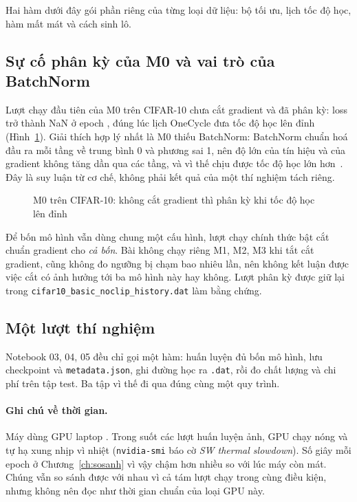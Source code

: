 Hai hàm dưới đây gói phần riêng của từng loại dữ liệu: bộ tối ưu, lịch tốc độ học, hàm mất mát và cách sinh lô.


\subsection{Sự cố phân kỳ của M0 và vai trò của BatchNorm}

Lượt chạy đầu tiên của M0 trên CIFAR-10 chưa cắt gradient và đã phân kỳ: loss trở thành NaN ở epoch
, đúng lúc lịch OneCycle đưa tốc độ học lên đỉnh
 (Hình~\ref{fig:clip}). Giải thích hợp lý nhất là M0 thiếu BatchNorm: BatchNorm chuẩn hoá đầu ra
mỗi tầng về trung bình 0 và phương sai 1, nên độ lớn của tín hiệu và của gradient không tăng dần qua các tầng, và vì thế
chịu được tốc độ học lớn hơn~\cite{ioffe2015}. Đây là suy luận từ cơ chế, không phải kết quả của một thí nghiệm tách riêng.

\begin{figure}[H]
  \centering
  \caption{M0 trên CIFAR-10: không cắt gradient thì phân kỳ khi tốc độ học lên đỉnh}
  \label{fig:clip}
\end{figure}

Để bốn mô hình vẫn dùng chung một cấu hình, lượt chạy chính thức bật cắt chuẩn gradient cho \emph{cả bốn}. Bài không
chạy riêng M1, M2, M3 khi tắt cắt gradient, cũng không đo ngưỡng bị chạm bao nhiêu lần, nên không kết luận được việc cắt
có ảnh hưởng tới ba mô hình này hay không. Lượt phân kỳ được giữ lại trong
\texttt{cifar10\_basic\_noclip\_history.dat} làm bằng chứng.

\subsection{Một lượt thí nghiệm}

Notebook 03, 04, 05 đều chỉ gọi một hàm: huấn luyện đủ bốn mô hình, lưu checkpoint và \texttt{metadata.json}, ghi đường
học ra \texttt{.dat}, rồi đo chất lượng và chi phí trên tập test. Ba tập vì thế đi qua đúng cùng một quy trình.


\paragraph{Ghi chú về thời gian.} Máy dùng GPU laptop . Trong suốt các lượt huấn luyện ảnh, GPU chạy
nóng và tự hạ xung nhịp vì nhiệt (\texttt{nvidia-smi} báo cờ \emph{SW thermal slowdown}). Số giây mỗi epoch ở
Chương~\ref{ch:sosanh} vì vậy chậm hơn nhiều so với lúc máy còn mát. Chúng vẫn so sánh được với nhau vì cả tám lượt chạy
trong cùng điều kiện, nhưng không nên đọc như thời gian chuẩn của loại GPU này.
